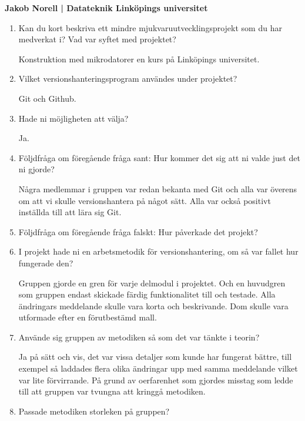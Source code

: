 \clearpage
\begin{center}
    \textbf{Jakob Norell | Datateknik Linköpings universitet}
\end{center}
\begin{enumerate}

  \item Kan du kort beskriva ett mindre mjukvaruutvecklingsprojekt som du har medverkat i? Vad var syftet med projektet?

  Konstruktion med mikrodatorer en kurs på Linköpings universitet.

  \item Vilket versionshanteringsprogram användes under projektet?

  Git och Github.

  \item Hade ni möjligheten att välja?

  Ja.

  \item Följdfråga om föregående fråga sant: Hur kommer det sig att ni valde just det ni gjorde?

  Några medlemmar i gruppen var redan bekanta med Git och alla var överens om att vi skulle versionshantera på något sätt. Alla var också positivt inställda till att lära sig Git.

  \item Följdfråga om föregående fråga falskt: Hur påverkade det projekt?

  \item I projekt hade ni en arbetsmetodik för versionshantering, om så var fallet hur fungerade den?

  Gruppen gjorde en gren för varje delmodul i projektet. Och en huvudgren som gruppen endast skickade färdig funktionalitet till och testade. Alla ändringars meddelande skulle vara korta och beskrivande. Dom skulle vara utformade efter en förutbestämd mall.

  \item Använde sig gruppen av metodiken så som det var tänkte i teorin?

  Ja på sätt och vis, det var vissa detaljer som kunde har fungerat bättre, till exempel så laddades flera olika ändringar upp med samma meddelande vilket var lite förvirrande. På grund av oerfarenhet som gjordes misstag som ledde till att gruppen var tvungna att kringgå metodiken.

  \item Passade metodiken storleken på gruppen?


\end{enumerate}
